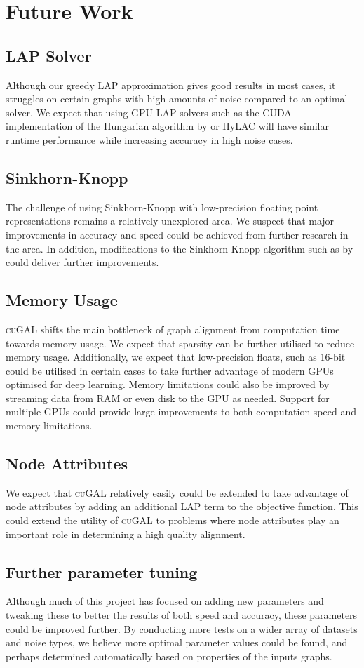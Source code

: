 \section{Future Work}\label{future-work}

\subsection{LAP Solver}
Although our greedy LAP approximation gives good results in most cases, it struggles on certain graphs with high amounts of noise compared to an optimal solver. We expect that using GPU LAP solvers such as the CUDA implementation of the Hungarian algorithm by \cite{date2016gpu} or HyLAC \citep{kawtikwar2024hylac} will have similar runtime performance while increasing accuracy in high noise cases.

\subsection{Sinkhorn-Knopp}
The challenge of using Sinkhorn-Knopp with low-precision floating point representations remains a relatively unexplored area. We suspect that major improvements in accuracy and speed could be achieved from further research in the area. In addition, modifications to the Sinkhorn-Knopp algorithm such as by \cite{tang2024accelerating} could deliver further improvements.

\subsection{Memory Usage}
\textsc{cuGAL} shifts the main bottleneck of graph alignment from computation time towards memory usage. We expect that sparsity can be further utilised to reduce memory usage. Additionally, we expect that low-precision floats, such as 16-bit could be utilised in certain cases to take further advantage of modern GPUs optimised for deep learning. Memory limitations could also be improved by streaming data from RAM or even disk to the GPU as needed. Support for multiple GPUs could provide large improvements to both computation speed and memory limitations.

\subsection{Node Attributes}
We expect that \textsc{cuGAL} relatively easily could be extended to take advantage of node attributes by adding an additional LAP term to the objective function. This could extend the utility of \textsc{cuGAL} to problems where node attributes play an important role in determining a high quality alignment. 

\subsection{Further parameter tuning}
Although much of this project has focused on adding new parameters and tweaking these to better the results of both speed and accuracy, these parameters could be improved further. By conducting more tests on a wider array of datasets and noise types, we believe more optimal parameter values could be found, and perhaps determined automatically based on properties of the inputs graphs.